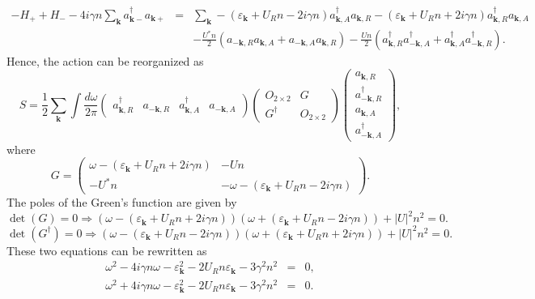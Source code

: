 \documentclass[aps,superscriptaddress,notitlepage,longbibliography]{revtex4-1}
\begin{document}
\begin{eqnarray}
-H_{+}+H_{-}-4i\gamma n\sum_{\bm{k}}a_{\bm{k}-}^{\dagger}a_{\bm{k}+} & = & \sum_{\bm{k}}-(\varepsilon_{\bm{k}}+U_{R}n-2i\gamma n)a_{\bm{k},A}^{\dagger}a_{\bm{k},R}-(\varepsilon_{\bm{k}}+U_{R}n+2i\gamma n)a_{\bm{k},R}^{\dagger}a_{\bm{k},A}\nonumber \\
 &  & -\frac{U^{\ast}n}{2}(a_{-\bm{k},R}a_{\bm{k},A}+a_{-\bm{k},A}a_{\bm{k},R})-\frac{Un}{2}(a_{\bm{k},R}^{\dagger}a_{-\bm{k},A}^{\dagger}+a_{\bm{k},A}^{\dagger}a_{-\bm{k},R}^{\dagger}).
\end{eqnarray}
Hence, the action can be reorganized as 
\begin{equation}
S=\frac{1}{2}\sum_{\bm{k}}\int\frac{d\omega}{2\pi}\left(\begin{array}{cccc}
a_{\bm{k},R}^{\dagger} & a_{-\bm{k},R} & a_{\bm{k},A}^{\dagger} & a_{-\bm{k},A}\end{array}\right)\left(\begin{array}{cc}
O_{2\times2} & G\\
G^{\dagger} & O_{2\times2}
\end{array}\right)\left(\begin{array}{c}
a_{\bm{k},R}\\
a_{-\bm{k},R}^{\dagger}\\
a_{\bm{k},A}\\
a_{-\bm{k},A}^{\dagger}
\end{array}\right),\label{eq:action4}
\end{equation}
where 
\begin{equation}
G=\left(\begin{array}{cc}
\omega-(\varepsilon_{\bm{k}}+U_{R}n+2i\gamma n) & -Un\\
-U^{\ast}n & -\omega-(\varepsilon_{\bm{k}}+U_{R}n-2i\gamma n)
\end{array}\right).
\end{equation}
The poles of the Green's function are given by 
\begin{equation}
\det(G)=0\Rightarrow(\omega-(\varepsilon_{\bm{k}}+U_{R}n+2i\gamma n))(\omega+(\varepsilon_{\bm{k}}+U_{R}n-2i\gamma n))+|U|^{2}n^{2}=0.
\end{equation}
\begin{equation}
\det(G^{\dagger})=0\Rightarrow(\omega-(\varepsilon_{\bm{k}}+U_{R}n-2i\gamma n))(\omega+(\varepsilon_{\bm{k}}+U_{R}n+2i\gamma n))+|U|^{2}n^{2}=0.
\end{equation}
These two equations can be rewritten as 
\begin{eqnarray}
\omega^{2}-4i\gamma n\omega-\varepsilon_{\bm{k}}^{2}-2U_{R}n\varepsilon_{\bm{k}}-3\gamma^{2}n^{2} & = & 0,\\
\omega^{2}+4i\gamma n\omega-\varepsilon_{\bm{k}}^{2}-2U_{R}n\varepsilon_{\bm{k}}-3\gamma^{2}n^{2} & = & 0.
\end{eqnarray}
\end{document}
